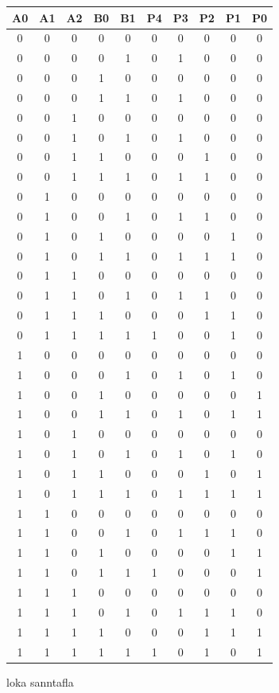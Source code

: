 \documentclass{article}
\begin{document}
\begin{center}
    \begin{tabular}{|c|c|c|c|c|c|c|c|c|c|}
        \hline
        A0&A1&A2&B0&B1&P4&P3&P2&P1&P0\\
        \hline
        0&0&0&0&0&0&0&0&0&0\\
        \hline
        0&0&0&0&1&0&1&0&0&0\\
        \hline
        0&0&0&1&0&0&0&0&0&0\\
        \hline
        0&0&0&1&1&0&1&0&0&0\\
        \hline
        0&0&1&0&0&0&0&0&0&0\\
        \hline
        0&0&1&0&1&0&1&0&0&0\\
        \hline
        0&0&1&1&0&0&0&1&0&0\\
        \hline
        0&0&1&1&1&0&1&1&0&0\\
        \hline
        0&1&0&0&0&0&0&0&0&0\\
        \hline
        0&1&0&0&1&0&1&1&0&0\\
        \hline
        0&1&0&1&0&0&0&0&1&0\\
        \hline
        0&1&0&1&1&0&1&1&1&0\\
        \hline
        0&1&1&0&0&0&0&0&0&0\\
        \hline
        0&1&1&0&1&0&1&1&0&0\\
        \hline
        0&1&1&1&0&0&0&1&1&0\\
        \hline
        0&1&1&1&1&1&0&0&1&0\\
        \hline
        1&0&0&0&0&0&0&0&0&0\\
        \hline
        1&0&0&0&1&0&1&0&1&0\\
        \hline
        1&0&0&1&0&0&0&0&0&1\\
        \hline
        1&0&0&1&1&0&1&0&1&1\\
        \hline
        1&0&1&0&0&0&0&0&0&0\\
        \hline
        1&0&1&0&1&0&1&0&1&0\\
        \hline
        1&0&1&1&0&0&0&1&0&1\\
        \hline
        1&0&1&1&1&0&1&1&1&1\\
        \hline
        1&1&0&0&0&0&0&0&0&0\\
        \hline
        1&1&0&0&1&0&1&1&1&0\\
        \hline
        1&1&0&1&0&0&0&0&1&1\\
        \hline
        1&1&0&1&1&1&0&0&0&1\\
        \hline
        1&1&1&0&0&0&0&0&0&0\\
        \hline
        1&1&1&0&1&0&1&1&1&0\\
        \hline
        1&1&1&1&0&0&0&1&1&1\\
        \hline
        1&1&1&1&1&1&0&1&0&1\\
        \hline
    \end{tabular}
\end{center}
loka sanntafla
\end{document}
